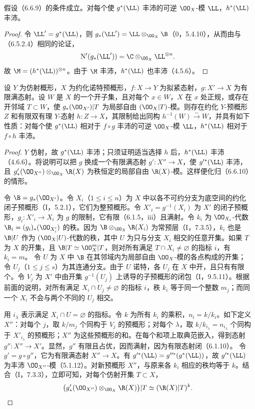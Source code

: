 假设（6.6.9）的条件成立。对每个使 $g^*(\LL)$ 丰沛的可逆 $\OO_X$-模 $\LL$，$h^*(\LL)$ 丰沛。
\begin{proof}
令 $\LL'=g^*(\LL)$，则 $g_*(\LL')=\LL\otimes_{\OO_X}\B$（0，5.4.10），从而由与（6.5.2.4）相同的论证，
\[
\mathrm N'(g_*(\LL'))=\C\otimes_{\OO_X}\LL^{\otimes n}.
\]
故 $\M=(h^*(\LL))^{\otimes n}$。由于 $\M$ 丰沛，$h^*(\LL)$ 也丰沛（4.5.6）。
\end{proof}

设 $Y$ 为仿射概形，$X$ 为约化诺特预概形，$f:X\to Y$ 为拟紧态射，$g:X'\to X$ 为有限满态射。设 $W$ 是 $X$ 的一个开子集，且对每个 $x\in W$，$X$ 在 $x$ 处正规，或存在开邻域 $T\subset W$，使 $g_*(\OO_{X'})|T$ 为局部自由 $(\OO_X|T)$-模。则存在约化 $Y$-预概形 $Z$ 和有限双有理 $Y$-态射 $h:Z\to X$，其限制给出同构 $h^{-1}(W)\xrightarrow{\sim}W$，并具有如下性质：对每个使 $g^*(\LL)$ 相对于 $f\circ g$ 丰沛的可逆 $\OO_X$-模 $\LL$，$h^*(\LL)$ 相对于 $f\circ h$ 丰沛。
\begin{proof}
$Y$ 仿射，故 $g^*(\LL)$ 丰沛；只须证明适当选择 $h$ 后，$h^*(\LL)$ 丰沛（4.6.6）。将说明可以把 $g$ 换成一个有限满态射 $g':X''\to X$，使 $g'^*(\LL)$ 丰沛，且 $g'_*(\OO_{X''})\otimes_{\OO_X}\R(X)$ 为秩恒定的局部自由 $\R(X)$-模。这样便化归（6.6.10）的情形。

令 $\B=g_*(\OO_{X'})$。令 $X_i$（$1\leq i\leq n$）为 $X$ 中以各不可约分支为底空间的约化闭子预概形（I，5.2.1），它们为整预概形。令 $X'_i=g^{-1}(X_i)$ 为 $X'$ 的闭子预概形，$g_i:X'_i\to X_i$ 为 $g$ 的限制，它有限（6.1.5，iii）且满射。令 $k_i$ 为 $\OO_{X_i}$-代数 $\B_i=(g_i)_*(\OO_{X'_i})$ 的秩。因为 $\B\otimes_{\OO_X}\R(X_i)$ 为常预层（I，7.3.5），$k_i$ 也是 $\B|U$ 作为 $(\OO_X|U)$-代数的秩，其中 $U$ 为只与分支 $X_i$ 相交的任意开集。如果 $T$ 为 $X$ 的开集，且 $\B|T\simeq\OO_X^m|T$，则对所有满足 $T\cap X_i\ne\varnothing$ 的指标 $i$，有 $k_i=m$。
令 $U$ 为 $X$ 中 $\B$ 在其邻域内为局部自由 $\OO_X$-模的各点构成的开集；令 $U_j$（$1\leq j\leq s$）为其连通分支。由于 $U$ 诺特，各 $U_j$ 在 $X$ 中开，且只有有限个。令 $V_j$ 为 $X'$ 中由开集 $g^{-1}(U_j)$ 上诱导的子预概形的闭包（I，9.5.11）。根据前面的说明，对所有满足 $X_i\cap U_j\ne\varnothing$ 的指标 $i$，秩 $k_i$ 等于同一个整数 $m_j$；而同一个 $X_i$ 不会与两个不同的 $U_j$ 相交。

用 $i_\lambda$ 表示满足 $X_i\cap U=\varnothing$ 的指标。令 $k$ 为所有 $k_i$ 的乘积，$n_i=k/k_i$。如下定义 $X''$：对每个 $j$，取 $k/m_j$ 个同构于 $V_j$ 的预概形；对每个 $\lambda$，取 $k/k_{i_\lambda}=n_{i_\lambda}$ 个同构于 $X'_{i_\lambda}$ 的预概形；$X''$ 为这些预概形的和。在每个和项上取典范嵌入，得到态射 $g'':X''\to X'$。显然，$g''$ 有限且占优，因而满射，因为有限态射闭（6.1.10）。
令 $g'=g\circ g''$，它为有限满态射 $X''\to X$。有
$g'^*(\LL)=g''^*(g^*(\LL))$，故 $g'^*(\LL)$ 为丰沛 $\OO_{X''}$-模（5.1.12）。对新预概形 $X''$，与原来各 $k_i$ 相应的秩均等于 $k$。结合（I，7.3.3），立即可知，对每个仿射开集 $T\subset X$，
\[
\bigl(g'_*(\OO_{X''})\otimes_{\OO_X}\R(X)\bigr)|T
\simeq (\R(X)|T)^k.
\]
\end{proof}

